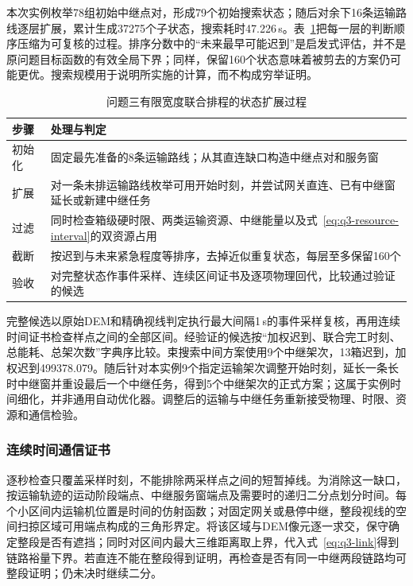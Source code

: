 本次实例枚举78组初始中继点对，形成79个初始搜索状态；随后对余下16条运输路线逐层扩展，累计生成37275个子状态，搜索耗时47.226\,s。表~\ref{tab:q3-search-flow}把每一层的判断顺序压缩为可复核的过程。排序分数中的“未来最早可能迟到”是启发式评估，并不是原问题目标函数的有效全局下界；同样，保留160个状态意味着被剪去的方案仍可能更优。搜索规模用于说明所实施的计算，而不构成穷举证明。
\begin{table}[htbp]
\centering\small
\caption{问题三有限宽度联合排程的状态扩展过程}
\label{tab:q3-search-flow}
\begin{tabular}{@{}p{}p{}@{}}
\toprule
步骤 & 处理与判定\\
\midrule
初始化 & 固定最先准备的8条运输路线；从其直连缺口构造中继点对和服务窗\\
扩展 & 对一条未排运输路线枚举可用开始时刻，并尝试网关直连、已有中继窗延长或新建中继任务\\
过滤 & 同时检查箱级硬时限、两类运输资源、中继能量以及式~\eqref{eq:q3-resource-interval}的双资源占用\\
截断 & 按迟到与未来紧急程度等排序，去掉近似重复状态，每层至多保留160个\\
验收 & 对完整状态作事件采样、连续区间证书及逐项物理回代，比较通过验证的候选\\
\bottomrule
\end{tabular}
\end{table}

完整候选以原始DEM和精确视线判定执行最大间隔1\,s的事件采样复核，再用连续时间证书检查样点之间的全部区间。经验证的候选按“加权迟到、联合完工时刻、总能耗、总架次数”字典序比较。束搜索中间方案使用9个中继架次，13箱迟到，加权迟到499378.079。随后针对本实例9个指定运输架次调整开始时刻，延长一条长时中继窗并重设最后一个中继任务，得到5个中继架次的正式方案；这属于实例时间细化，并非通用自动优化器。调整后的运输与中继任务重新接受物理、时限、资源和通信检验。

\subsubsection{连续时间通信证书}
逐秒检查只覆盖采样时刻，不能排除两采样点之间的短暂掉线。为消除这一缺口，按运输轨迹的运动阶段端点、中继服务窗端点及需要时的递归二分点划分时间。每个小区间内运输机位置是时间的仿射函数；对固定网关或悬停中继，整段视线的空间扫掠区域可用端点构成的三角形界定。将该区域与DEM像元逐一求交，保守确定整段是否有遮挡；同时对区间内最大三维距离取上界，代入式~\eqref{eq:q3-link}得到链路裕量下界。若直连不能在整段得到证明，再检查是否有同一中继两段链路均可整段证明；仍未决时继续二分。

